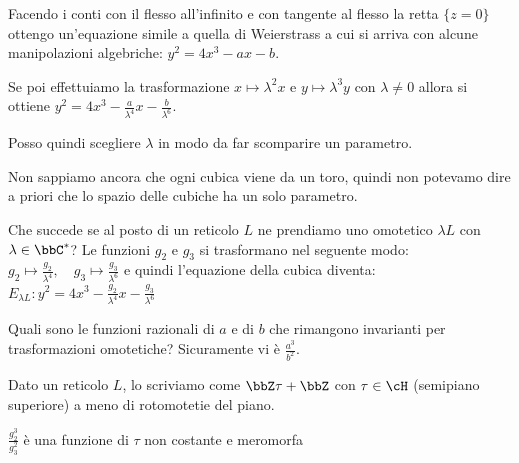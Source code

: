 
Facendo i conti con il flesso all'infinito e con tangente al flesso la
retta $\{ z = 0 \}$ ottengo un'equazione simile a quella di Weierstrass
a cui si arriva con alcune manipolazioni algebriche:
$y^2 = 4 x^3 - a x - b$.

Se poi effettuiamo la trasformazione $x \mapsto \lambda^2 x$ e $y
\mapsto \lambda^3 y$ con $\lambda \neq 0$ allora si ottiene $y^2 = 4 x^3
- \frac{a}{\lambda^4} x - \frac{b}{\lambda^6}$.

Posso quindi scegliere $\lambda$ in modo da far scomparire un parametro.

\begin{osservazione}
  Non sappiamo ancora che ogni cubica viene da un toro, quindi non
  potevamo dire a priori che lo spazio delle cubiche ha un solo
  parametro.
\end{osservazione}

Che succede se al posto di un reticolo $L$ ne prendiamo uno omotetico
$\lambda L$ con $\lambda \in \bbC^*$? Le funzioni $g_2$ e $g_3$ si
trasformano nel seguente modo:
$ g_2 \mapsto \frac{g_2}{\lambda^4} ,\quad g_3 \mapsto
\frac{g_3}{\lambda^6}$ e quindi l'equazione della cubica diventa:
$E_{\lambda L}: y^2 = 4x^3 - \frac{g_2}{\lambda^4} x -
\frac{g_3}{\lambda^6}$

Quali sono le funzioni razionali di $a$ e di $b$ che rimangono
invarianti per trasformazioni omotetiche? Sicuramente vi è
$\frac{a^3}{b^2}$.

Dato un reticolo $L$, lo scriviamo come $\bbZ \tau + \bbZ$ con $\tau \in
\cH$ (semipiano superiore) a meno di rotomotetie del piano.

\begin{proposizione}
  $\frac{g_2^3}{g_3^2}$ è una funzione di $\tau$ non costante e meromorfa
\end{proposizione}

